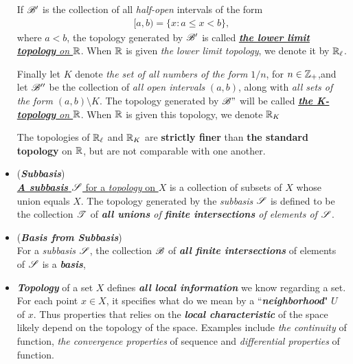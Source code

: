 \documentclass[11pt]{article}
\begin{document}
\begin{itemize}
\begin{example}
If ${\mathscr B}'$ is the collection of all \emph{half-open} intervals of the form
\begin{align*}
[a,b) = \{x: a \le  x < b\},
\end{align*} where $a < b$, the topology generated by ${\mathscr B}'$ is called \underline{\emph{\textbf{the lower limit topology} on ${\mathbb R}$}}. When ${\mathbb R}$ is given \emph{the lower limit topology}, we denote it by ${\mathbb R}_{\ell}$.

Finally let $K$ denote \emph{the set of all numbers of the form} $1/n$, for $n \in {\mathbb Z}_{+}$,and let ${\mathscr B}''$ be the collection of \emph{all open intervals} $(a,b)$, along with \emph{all sets of the form $(a,b) \setminus K$}. The topology generated by ${\mathscr B}"$ will be called \underline{\emph{\textbf{the K-topology} on ${\mathbb R}$}}. When ${\mathbb R}$ is given this topology, we denote ${\mathbb R}_{K}$

\begin{lemma}
The topologies of ${\mathbb R}_{\ell}$ and ${\mathbb R}_{K}$ are \textbf{strictly finer} than \textbf{the standard topology} on ${\mathbb R}$, but are not comparable with one another.
\end{lemma}
\end{example}

\item \begin{definition}(\emph{\textbf{Subbasis}})\\
\underline{\emph{\textbf{A subbasis}} ${\mathscr S}$ for a \emph{topology} on $X$} is a collection of subsets of $X$ whose union equals $X$. The topology generated by the \emph{subbasis} ${\mathscr S}$ is defined to be the  collection ${\mathscr T}$ of \emph{\textbf{all unions} of \textbf{finite intersections} of elements of ${\mathscr S}$}.
\end{definition}

\item \begin{remark}(\textbf{\emph{Basis from Subbasis}})\\
For a \emph{subbasis} ${\mathscr S}$, the collection ${\mathscr B}$ of \emph{\textbf{all finite intersections}} of elements of ${\mathscr S}$ is a \emph{\textbf{basis}},
\end{remark}


\item \begin{remark}
\emph{\textbf{Topology}} of a set $X$ defines \emph{\textbf{all local information}} we know regarding a set. For each point  $x \in X$, it specifies what do we mean by a ``\emph{\textbf{neighborhood}}" $U$ of $x$. Thus properties that relies on the \emph{\textbf{local characteristic}} of the space  likely depend on the topology of the space. Examples include \emph{the continuity} of function, \emph{the convergence properties} of sequence and \emph{differential properties} of function. 
\end{remark}
\end{itemize}
\end{document}

